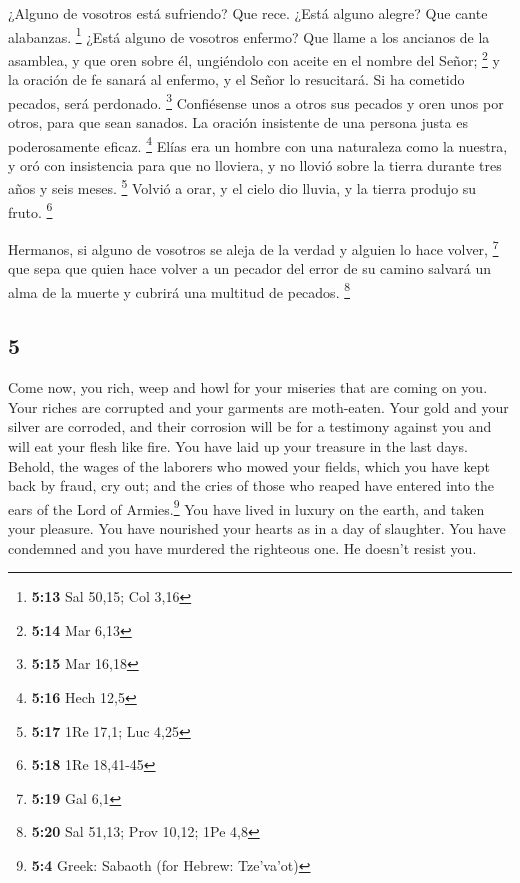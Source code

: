 \begin{paracol}{2}
 ¿Alguno de vosotros está sufriendo? Que rece. ¿Está
alguno alegre? Que cante alabanzas. \footnote{\textbf{5:13} Sal 50,15;
  Col 3,16}  ¿Está alguno de vosotros enfermo? Que llame
a los ancianos de la asamblea, y que oren sobre él, ungiéndolo con
aceite en el nombre del Señor; \footnote{\textbf{5:14} Mar 6,13}
 y la oración de fe sanará al enfermo, y el Señor lo
resucitará. Si ha cometido pecados, será perdonado. \footnote{\textbf{5:15}
  Mar 16,18}  Confiésense unos a otros sus pecados y oren
unos por otros, para que sean sanados. La oración insistente de una
persona justa es poderosamente eficaz. \footnote{\textbf{5:16} Hech 12,5}
 Elías era un hombre con una naturaleza como la nuestra,
y oró con insistencia para que no lloviera, y no llovió sobre la tierra
durante tres años y seis meses. \footnote{\textbf{5:17} 1Re 17,1; Luc
  4,25}  Volvió a orar, y el cielo dio lluvia, y la
tierra produjo su fruto. \footnote{\textbf{5:18} 1Re 18,41-45}

 Hermanos, si alguno de vosotros se aleja de la verdad y
alguien lo hace volver, \footnote{\textbf{5:19} Gal 6,1} 
que sepa que quien hace volver a un pecador del error de su camino
salvará un alma de la muerte y cubrirá una multitud de pecados.
\footnote{\textbf{5:20} Sal 51,13; Prov 10,12; 1Pe 4,8} \switchcolumn
\begin{otherlanguage}{english}

\hypertarget{section-9}{%
\section{5}\label{section-9}}

 Come now, you rich, weep and howl for your miseries that
are coming on you.  Your riches are corrupted and your
garments are moth-eaten.  Your gold and your silver are
corroded, and their corrosion will be for a testimony against you and
will eat your flesh like fire. You have laid up your treasure in the
last days.  Behold, the wages of the laborers who mowed
your fields, which you have kept back by fraud, cry out; and the cries
of those who reaped have entered into the ears of the Lord of
Armies.\footnote{\textbf{5:4} Greek: Sabaoth (for Hebrew: Tze'va'ot)}
 You have lived in luxury on the earth, and taken your
pleasure. You have nourished your hearts as in a day of slaughter.
 You have condemned and you have murdered the righteous
one. He doesn't resist you.


\end{otherlanguage}
\end{paracol}
